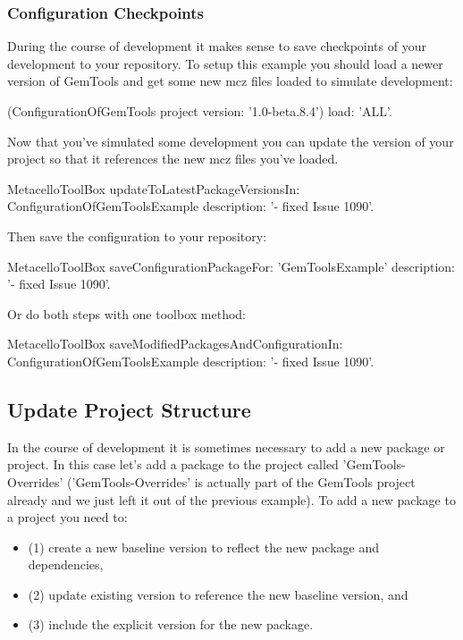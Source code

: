 \documentclass[a4paper,10pt,twoside]{book}
\begin{document}
\subsubsection{Configuration Checkpoints}

During the course of development it makes sense to save checkpoints of your development to your repository. To setup this example you should load a newer version of GemTools and get some new mcz files loaded to simulate development:

\begin{code}{}
(ConfigurationOfGemTools project version: '1.0-beta.8.4')
  load: 'ALL'.
\end{code}  

Now that you've simulated some development you can update the  version of your project so that it references the new mcz files you've loaded.

\begin{code}{}
MetacelloToolBox
  updateToLatestPackageVersionsIn: ConfigurationOfGemToolsExample
  description: '- fixed Issue 1090'.
 \end{code} 
 
Then save the configuration to your repository:

\begin{code}{}
MetacelloToolBox
  saveConfigurationPackageFor: 'GemToolsExample'
  description: '- fixed Issue 1090'.
 \end{code}
    
Or do both steps with one toolbox method:

\begin{code}{}
MetacelloToolBox
  saveModifiedPackagesAndConfigurationIn: ConfigurationOfGemToolsExample
  description: '- fixed Issue 1090'.
\end{code}
  
\subsection{Update Project Structure}

In the course of development it is sometimes necessary to add a new package or project. In this case let's add a package to the project called 'GemTools-Overrides' ('GemTools-Overrides' is actually part of the GemTools project already and we just left it out of the previous example). To add a new package to a project you need to:

\begin{itemize}
\item (1) create a new baseline version to reflect the new package and dependencies, 
\item (2) update existing  version to reference the new baseline version, and 
\item (3) include the explicit version for the new package.
\end{itemize}
\end{document}
